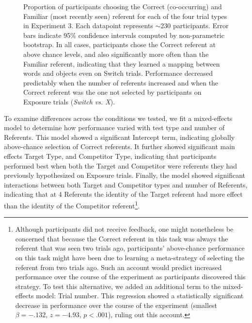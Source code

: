 \documentclass[authoryear,review]{elsarticle}
\begin{document}
 \begin{figure}[tb]
	\caption{\label{fig:exp3_data} Proportion of participants choosing the Correct (co-occurring) and Familiar (most recently seen) referent for each of the four trial types in Experiment 3. Each datapoint represents $\sim$230 participants. Error bars indicate 95\% confidence intervals computed by non-parametric bootstrap. In all cases, participants chose the Correct referent at above chance levels, and also significantly more often than the Familiar referent, indicating that they learned a mapping between words and objects even on Switch trials. Performance decreased predictably when the number of referents increased and when the Correct referent was the one not selected by participants on Exposure trials (\emph{Switch vs. X}).}
\end{figure}

To examine differences across the conditions we tested, we fit a mixed-effects model to determine how performance varied with test type and number of Referents. This model showed a significant Intercept term, indicating globally above-chance selection of Correct referents. It further showed significant main effects Target Type, and Competitor Type, indicating that participants performed best when both the Target and Competitor were referents they had previously hypothesized on Exposure trials. Finally, the model showed significant interactions between both Target and Competitor types and number of Referents, indicating that at 4 Referents the identity of the Target referent had more effect than the identity of the Competitor referent\footnote{Although participants did not receive feedback, one might nonetheless be concerned that because the Correct referent in this task was always the referent that was seen two trials ago, participants' above-chance performance on this task might have been due to learning a meta-strategy of selecting the referent from two trials ago. Such an account would predict increased performance over the course of the experiment as participants discovered this strategy. To test this alternative, we added an additional term to the mixed-effects model: Trial number. This regression showed a statistically significant decrease in performance over the course of the experiment (smallest $\beta =  -.132$, $z=-4.93$, $p< .001$), ruling out this account.}. 
\end{document}
